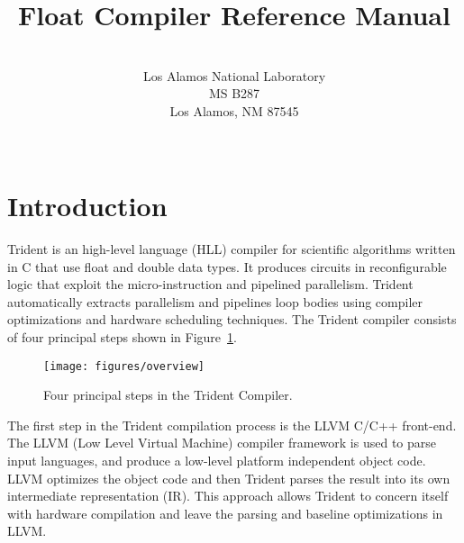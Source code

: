 \documentclass[12pt]{article}
\begin{document}
\title{Float Compiler Reference Manual }
       
\author{\\
Los Alamos National Laboratory \\ MS B287\\
Los Alamos, NM 87545\\ \\
}

\maketitle





\section{Introduction}
Trident is an high-level language (HLL) compiler for scientific
algorithms written in C that use float and double data types.  It
produces circuits in reconfigurable logic that exploit the
micro-instruction and pipelined parallelism.  Trident automatically
extracts parallelism and pipelines loop bodies using compiler
optimizations and hardware scheduling techniques.  The Trident
compiler consists of four principal steps shown in
Figure~\ref{fig:overview}.

\begin{figure}[ht]
\centering
\texttt{[image: figures/overview]}
\caption{\label{fig:overview} Four principal steps in the Trident Compiler.}
\end{figure}


The first step in the Trident compilation process is the LLVM C/C++
front-end.  The LLVM (Low Level Virtual Machine) compiler
framework\cite{lattner04llvm} is used to parse input languages, and
produce a low-level platform independent object code.  LLVM optimizes
the object code and then Trident parses the result into its own
intermediate representation (IR).  This approach allows Trident to
concern itself with hardware compilation and leave the parsing and
baseline optimizations in LLVM.
\end{document}

